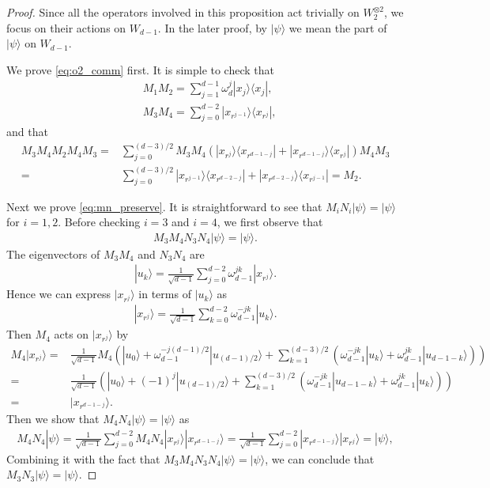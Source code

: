 \documentclass[11pt,letterpaper]{article}
\newcommand{\ket}[1]{|#1\rangle}
\newcommand{\ketbra}[2]{|#1\rangle\langle#2|}
\newcommand{\x}{\otimes}
\newcommand{\1}{\mathbb{1}}
\theoremstyle{definition}
\begin{document}
\begin{proof}
	Since all the operators involved in this proposition act trivially on $W_2^{\x 2}$, we focus on
	their actions on $W_{d-1}$. In the later proof, by $\ket{\psi}$ we mean the part of $\ket{\psi}$ on $W_{d-1}$.
	
	We prove \cref{eq:o2_comm} first. It is simple to check that
	\begin{align}
		&M_1M_2= \sum_{j=1}^{d-1} \omega_d^{j} \ketbra{x_j}{x_j},\\
		&M_3M_4= \sum_{j=0}^{d-2} \ketbra{x_{r^{j-1}}}{x_{r^j}},
	\end{align}
	and that 
	\begin{align}
		M_3M_4 M_2 M_4 M_3 = &\sum_{j=0}^{(d-3)/2} M_3M_4 (\ketbra{x_{r^j}}{x_{r^{d-1-j}}}+\ketbra{x_{r^{d-1-j}}}{x_{r^j}}) M_4M_3\\
		=& \sum_{j=0}^{(d-3)/2} \ketbra{x_{r^{j-1}}}{x_{r^{d-2-j}}}+\ketbra{x_{r^{d-2-j}}}{x_{r^{j-1}}} = M_2.
	\end{align}
	
	Next we prove \cref{eq:mn_preserve}. It is straightforward to see that $M_iN_i \ket{\psi} = \ket{\psi}$ for $i = 1,2$.
	Before checking $i=3$ and $i=4$, we first observe that
	\begin{align}
		M_3M_4 N_3 N_4 \ket{\psi} = \ket{\psi}.
	\end{align}
	The eigenvectors of $M_3M_4$ and $N_3N_4$ are 
        \begin{align}
        		\ket{u_k} = \frac{1}{\sqrt{d-1}} \sum_{j=0}^{d-2} \omega_{d-1}^{jk} \ket{x_{r^j}}.
        \end{align}
        Hence we can express $\ket{x_{r^j}}$ in terms of $\ket{u_k}$ as 
        \begin{align}
        		\ket{x_{r^j}} = \frac{1}{\sqrt{d-1}} \sum_{k=0}^{d-2} \omega_{d-1}^{-jk} \ket{u_k}.
        \end{align}
        Then $M_4$ acts on $\ket{x_{r^j}}$ by
        \begin{align*}
        		M_4 \ket{x_{r^j}} =& \frac{1}{\sqrt{d-1}} M_4\left(\ket{u_0} + \omega_{d-1}^{-j(d-1)/2}\ket{u_{(d-1)/2}}  + 
        	\sum_{k=1}^{(d-3)/2} (\omega_{d-1}^{-jk} \ket{u_k} + \omega_{d-1}^{jk} \ket{u_{d-1-k}})\right) \\
        	=&\frac{1}{\sqrt{d-1}} \left(\ket{u_0} + (-1)^j\ket{u_{(d-1)/2}}  + 
        	\sum_{k=1}^{(d-3)/2} (\omega_{d-1}^{-jk} \ket{u_{d-1-k}} + \omega_{d-1}^{jk} \ket{u_{k}})\right) \\
        	=& \ket{x_{r^{d-1-j}}}.
        \end{align*}
        Then we show that $M_4  N_4 \ket{\psi} = \ket{\psi}$ as 
        \begin{align}
        	M_4 N_4 \ket{\psi} = \frac{1}{\sqrt{d-1}}  \sum_{j=0}^{d-2} M_4  N_4 \ket{x_{r^j}} \ket{x_{r^{d-1-j}}} 
        	= \frac{1}{\sqrt{d-1}} \sum_{j=0}^{d-2} \ket{x_{r^{d-1-j}}} \ket{x_{r^{j}}} =\ket{\psi},
        \end{align}
	Combining it with the fact that $M_3M_4 N_3N_4 \ket{\psi} = \ket{\psi}$, we can conclude that
	$M_3N_3 \ket{\psi} = \ket{\psi}$.
\end{proof}
\end{document}

